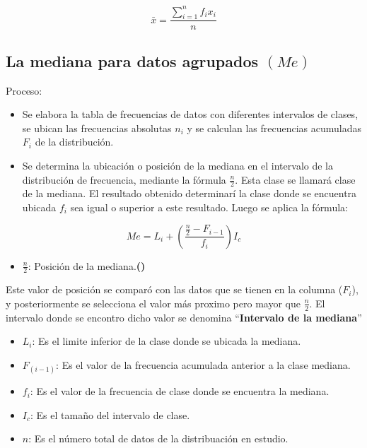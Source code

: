 \documentclass[
]{book}
\providecommand{\tightlist}{%
  \setlength{\itemsep}{0pt}\setlength{\parskip}{0pt}}
\theoremstyle{definition}
\theoremstyle{definition}
\theoremstyle{definition}
\theoremstyle{definition}
\theoremstyle{remark}
\begin{document}
\[
\bar{x}=\dfrac{\sum_{i=1}^{n}f_{i}x_{i}}{n}
\]

\hypertarget{la-mediana-para-datos-agrupados-me}{%
\subsection{\texorpdfstring{La mediana para datos agrupados \((Me)\)}{La mediana para datos agrupados (Me)}}\label{la-mediana-para-datos-agrupados-me}}

Proceso:

\begin{itemize}
\item
  Se elabora la tabla de frecuencias de datos con diferentes intervalos de clases, se ubican las frecuencias absolutas \(n_{i}\) y se calculan las frecuencias acumuladas \(F_{i}\) de la distribución.
\item
  Se determina la ubicación o posición de la mediana en el intervalo de la distribución de frecuencia, mediante la fórmula \(\frac{n}{2}\). Esta clase se llamará clase de la mediana. El resultado obtenido determinarí la clase donde se encuentra ubicada \(f_{i}\) sea igual o superior a este resultado. Luego se aplica la fórmula:
\end{itemize}

\[Me=L_{i}+\left( \dfrac{\frac{n}{2}-F_{i-1}}{f_{i}}\right) I_c\]

\begin{itemize}
\tightlist
\item
  \(\frac{n}{2}\): Posición de la mediana.\textbf{()}
\end{itemize}

Este valor de posición se comparó con las datos que se tienen en la columna (\textbf{\(F_i\)}), y posteriormente se selecciona el valor más proximo pero mayor que \(\frac{n}{2}\). El intervalo donde se encontro dicho valor se denomina ``\textbf{Intervalo de la mediana}''

\begin{itemize}
\item
  \(L_{i}\): Es el limite inferior de la clase donde se ubicada la mediana.
\item
  \(F_{(i-1)}\): Es el valor de la frecuencia acumulada anterior a la clase mediana.
\item
  \(f_{i}\): Es el valor de la frecuencia de clase donde se encuentra la mediana.
\item
  \(I_{c}\): Es el tamaño del intervalo de clase.
\item
  \(n\): Es el número total de datos de la distribuación en estudio.
\end{itemize}
\end{document}

